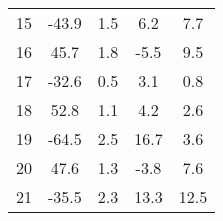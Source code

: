 \begin{tabular}{rSSSS}
     15 &               -43.9 &                        1.5 &                             6.2 &                                    7.7 \\
     16 &                45.7 &                        1.8 &                            -5.5 &                                    9.5 \\
     17 &               -32.6 &                        0.5 &                             3.1 &                                    0.8 \\
     18 &                52.8 &                        1.1 &                             4.2 &                                    2.6 \\
     19 &               -64.5 &                        2.5 &                            16.7 &                                    3.6 \\
     20 &                47.6 &                        1.3 &                            -3.8 &                                    7.6 \\
     21 &               -35.5 &                        2.3 &                            13.3 &                                   12.5 \\
\bottomrule
\end{tabular}
